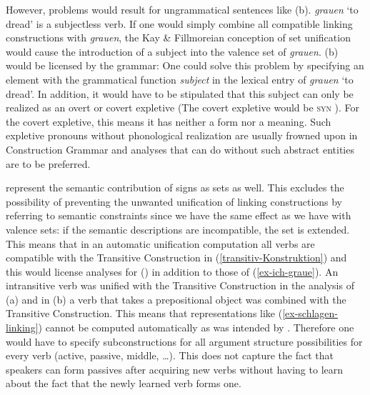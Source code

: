 However, problems would result for ungrammatical sentences like (b). \emph{grauen} `to dread' is a
subjectless verb. If one would simply combine all compatible linking
constructions with \emph{grauen}, the Kay \& Fillmoreian conception of set unification would cause the
introduction of a subject into the valence set of \emph{grauen}. (b) would be licensed by the grammar:
\eal
{}
\zl
One could solve this problem by specifying an element with the grammatical function \emph{subject}
in the lexical entry of \emph{grauen} `to dread'. In addition, it would have to be stipulated that this subject
can only be realized as an overt or covert expletive (The covert expletive would be \textsc{syn} ). For the covert
expletive, this means it has neither a form nor a meaning. Such expletive pronouns without
phonological realization are usually frowned upon in Construction Grammar and analyses that can do
without such abstract entities are to be preferred.

\citet{KF99a} represent the semantic contribution of signs as sets as well. This excludes the
possibility of preventing the unwanted unification of linking constructions by referring to semantic
constraints since we have the same effect as we have with valence sets: if the semantic
descriptions are incompatible, the set is extended. This means that in an automatic unification
computation all verbs are compatible with the Transitive Construction in
(\ref{transitiv-Konstruktion}) and this would license analyses for () in addition to those of (\ref{ex-ich-graue}).
\eal
{}
\zl
An intransitive verb was unified with the Transitive Construction in the analysis of (a) and
in (b) a verb that takes a prepositional object was combined with the Transitive
Construction. This means that representations like (\ref{ex-schlagen-linking}) cannot be computed
automatically as was intended by \citet{Kay2002a}. Therefore one would have to specify subconstructions for all argument structure
possibilities for every verb (active, passive, middle, \ldots). This does not capture the fact that
speakers can form passives after acquiring new verbs without having to learn about the fact that the
newly learned verb forms one. %
%

